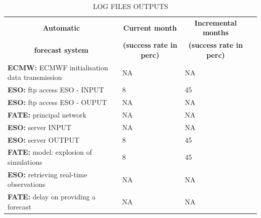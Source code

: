 \documentclass[a4paper,english]{article}
\newcommand{\HRule}{\rule{\linewidth}{0.5mm}}
\begin{document}
\clearpage
\begin{table}[]
\begin{center}
\begin{tabular}{|l|l|l|l|}
\hline
\multicolumn{1}{|c|}{\cellcolor[HTML]{C0C0C0}\textbf{Automatic}} & \multicolumn{1}{c|}{\cellcolor[HTML]{C0C0C0}\textbf{Current month}} & \multicolumn{1}{c|}{\cellcolor[HTML]{C0C0C0}\textbf{Incremental months}} \\
\multicolumn{1}{|c|}{\cellcolor[HTML]{C0C0C0}\textbf{forecast system}} & \multicolumn{1}{c|}{\cellcolor[HTML]{C0C0C0}\textbf{(success rate in perc)}} & \multicolumn{1}{c|}{\cellcolor[HTML]{C0C0C0}\textbf{(success rate in perc)}} \\
\hline
\cellcolor[HTML]{C0C0C0}\textbf{ECMW:} ECMWF initialisation data transmission  & NA           & NA    \\
\cellcolor[HTML]{C0C0C0}\textbf{ESO:} ftp access ESO - INPUT                   & 8           & 45   \\
\cellcolor[HTML]{C0C0C0}\textbf{ESO:} ftp access ESO - OUPUT                   & NA           & NA   \\
\cellcolor[HTML]{C0C0C0}\textbf{FATE:} principal network                       & NA           & NA   \\
\cellcolor[HTML]{C0C0C0}\textbf{ESO:} server INPUT                             & NA           & NA   \\
\cellcolor[HTML]{C0C0C0}\textbf{ESO:} server OUTPUT                            & 8           & 45   \\
\cellcolor[HTML]{C0C0C0}\textbf{FATE:} model: explosion of simulations         & 8           & 45   \\
\cellcolor[HTML]{C0C0C0}\textbf{ESO:} retrieving real-time observations        & NA           & NA   \\
\cellcolor[HTML]{C0C0C0}\textbf{FATE:} delay on providing a forecast           & NA           & NA   \\
\hline
\end{tabular}
\caption{LOG FILES OUTPUTS}
\end{center}
\end{table}

\clearpage
\end{document}
